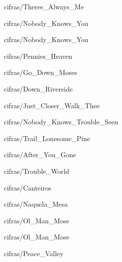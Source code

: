 \documentclass{scrartcl}
\begin{document}

{cifras/Theres_Always_Me}


{cifras/Nobody_Knows_You}


{cifras/Nobody_Knows_You}


{cifras/Pennies_Heaven}


{cifras/Go_Down_Moses}


{cifras/Down_Riverside}


{cifras/Just_Closer_Walk_Thee}


{cifras/Nobody_Knows_Trouble_Seen}


{cifras/Trail_Lonesome_Pine}


{cifras/After_You_Gone}


{cifras/Trouble_World}


{cifras/Canteiros}


{cifras/Naquela_Mesa}


{cifras/Ol_Man_Mose}


{cifras/Ol_Man_Mose}


{cifras/Peace_Valley}
\end{document}
